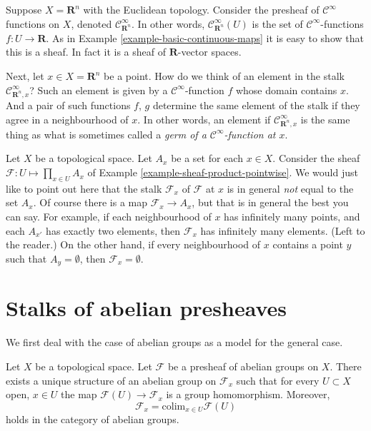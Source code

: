 \begin{example}
\label{example-germs-functions}
Suppose $X = \mathbf{R}^n$ with the Euclidean topology.
Consider the presheaf of $\mathcal{C}^\infty$ functions
on $X$, denoted $\mathcal{C}^\infty_{\mathbf{R}^n}$.
In other words, $\mathcal{C}^\infty_{\mathbf{R}^n}(U)$ is the set
of $\mathcal{C}^\infty$-functions $f : U \to \mathbf{R}$.
As in Example \ref{example-basic-continuous-maps}
it is easy to show that this is a sheaf. In fact it
is a sheaf of $\mathbf{R}$-vector spaces.

\medskip\noindent
Next, let $x \in X = \mathbf{R}^n$ be a point. How do
we think of an element in the stalk $\mathcal{C}^\infty_{\mathbf{R}^n,x}$?
Such an element is given by a $\mathcal{C}^\infty$-function 
$f$ whose domain contains $x$. And a pair of such
functions $f$, $g$ determine
the same element of the stalk if they agree in a neighbourhood
of $x$. In other words, an element if $\mathcal{C}^\infty_{\mathbf{R}^n,x}$
is the same thing as what is sometimes called
a {\it germ of a $\mathcal{C}^\infty$-function at $x$}.
\end{example}

\begin{example}
\label{example-sheaf-product-pointwise-stalk}
Let $X$ be a topological space. Let $A_x$ be a set for each $x \in X$.
Consider the sheaf $\mathcal{F} : U \mapsto \prod_{x\in U} A_x$ of Example
\ref{example-sheaf-product-pointwise}. We would just like to point
out here that the stalk $\mathcal{F}_x$ of $\mathcal{F}$ at $x$
is in general {\it not} equal to the set $A_x$. Of course there is
a map $\mathcal{F}_x \to A_x$, but that is in general the best you
can say. For example, if each neighbourhood of $x$
has infinitely many points, and each $A_{x'}$ has exactly two elements,
then $\mathcal{F}_x$ has infinitely many elements. (Left to the
reader.) On the other hand, if every neighbourhood of $x$ contains
a point $y$ such that $A_y = \emptyset$, then $\mathcal{F}_x = \emptyset$.
\end{example}



\section{Stalks of abelian presheaves}
\label{section-stalks-abelian-presheaves}

\noindent
We first deal with the case of abelian groups as
a model for the general case.

\begin{lemma}
\label{lemma-stalk-abelian-presheaf}
Let $X$ be a topological space. Let $\mathcal{F}$ be a presheaf
of abelian groups on $X$. There exists a unique structure of an
abelian group on $\mathcal{F}_x$ such that for every
$U \subset X$ open, $x\in U$ the map $\mathcal{F}(U) \to \mathcal{F}_x$
is a group homomorphism. Moreover, 
$$
\mathcal{F}_x
=
\text{colim}_{x\in U} \mathcal{F}(U)
$$
holds in the category of abelian groups.
\end{lemma}

